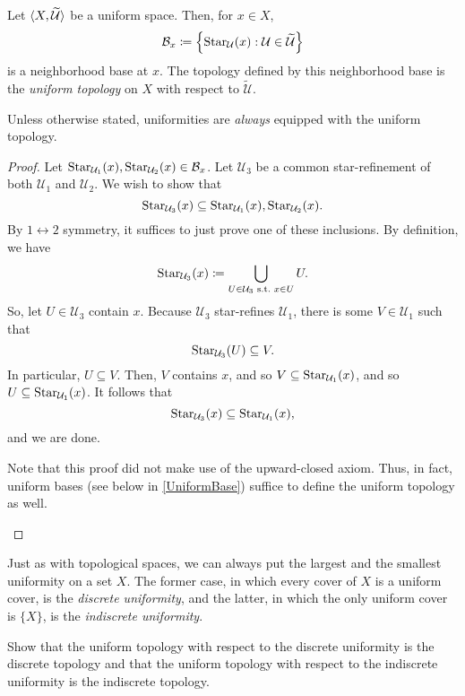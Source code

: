 \begin{prp}\label{UniformTopology}
Let $\langle X,\widetilde{\mathcal{U}}\rangle$ be a uniform space.  Then, for $x\in X$,
\begin{equation}
\mathcal{B}_x\coloneqq \left\{ \operatorname{Star} _{\mathcal{U}}(x):\mathcal{U}\in \widetilde{\mathcal{U}}\right\}
\end{equation}
is a neighborhood base at $x$.  The topology defined by this neighborhood base is the \emph{uniform topology} on $X$ with respect to $\widetilde{\mathcal{U}}$.
\begin{rmk}
Unless otherwise stated, uniformities are \emph{always} equipped with the uniform topology.
\end{rmk}
\begin{proof}
Let $\operatorname{Star} _{\mathcal{U}_1}(x),\operatorname{Star} _{\mathcal{U}_2}(x)\in \mathcal{B}_x$.  Let $\mathcal{U}_3$ be a common star-refinement of both $\mathcal{U}_1$ and $\mathcal{U}_2$.  We wish to show that
\begin{equation}
\operatorname{Star} _{\mathcal{U}_3}(x)\subseteq \operatorname{Star} _{\mathcal{U}_1}(x),\operatorname{Star} _{\mathcal{U}_2}(x).
\end{equation}
By $1\leftrightarrow 2$ symmetry, it suffices to just prove one of these inclusions.  By definition, we have
\begin{equation}
\operatorname{Star} _{\mathcal{U}_3}(x)\coloneqq \bigcup _{U\in \mathcal{U}_3\text{ s.t.~} x\in U}U.
\end{equation}
So, let $U\in \mathcal{U}_3$ contain $x$.  Because $\mathcal{U}_3$ star-refines $\mathcal{U}_1$, there is some $V\in \mathcal{U}_1$ such that
\begin{equation}
\operatorname{Star} _{\mathcal{U}_3}(U)\subseteq V.
\end{equation}
In particular, $U\subseteq V$.  Then, $V$ contains $x$, and so $V\subseteq \operatorname{Star} _{\mathcal{U}_1}(x)$, and so $U\subseteq \operatorname{Star} _{\mathcal{U}_1}(x)$.  It follows that
\begin{equation}
\operatorname{Star} _{\mathcal{U}_3}(x)\subseteq \operatorname{Star} _{\mathcal{U}_1}(x),
\end{equation}
and we are done.
\begin{rmk}
Note that this proof did not make use of the upward-closed axiom.  Thus, in fact, uniform bases (see below in \cref{UniformBase}) suffice to define the uniform topology as well.
\end{rmk}
\end{proof}
\end{prp}
\begin{exm}
Just as with topological spaces, we can always put the largest and the smallest uniformity on a set $X$.  The former case, in which every cover of $X$ is a uniform cover, is the \emph{discrete uniformity}, and the latter, in which the only uniform cover is $\{ X\}$, is the \emph{indiscrete uniformity}.
\begin{exr}
Show that the uniform topology with respect to the discrete uniformity is the discrete topology and that the uniform topology with respect to the indiscrete uniformity is the indiscrete topology.
\end{exr}
\end{exm}

